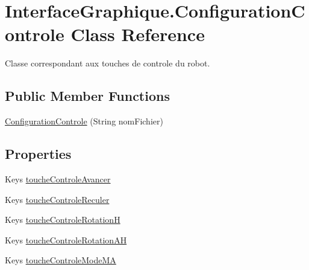 \hypertarget{class_interface_graphique_1_1_configuration_controle}{}\section{Interface\+Graphique.\+Configuration\+Controle Class Reference}
\label{class_interface_graphique_1_1_configuration_controle}


Classe correspondant aux touches de controle du robot.  


\subsection*{Public Member Functions}
\begin{DoxyCompactItemize}
\item 
\hyperlink{group__inf2990_ga88dec4378a0a6a4e0ad4d7bc3b6d516a}{Configuration\+Controle} (String nom\+Fichier)
\end{DoxyCompactItemize}
\subsection*{Properties}
\begin{DoxyCompactItemize}
\item 
Keys \hyperlink{group__inf2990_ga52e17be4f7288e0b10e953bd432ecec9}{touche\+Controle\+Avancer}
\item 
Keys \hyperlink{group__inf2990_ga96cf491ad288a4ef333cb27f6ff718d6}{touche\+Controle\+Reculer}
\item 
Keys \hyperlink{group__inf2990_gacc59582f5bd9413c8b5ace6a7fa1f878}{touche\+Controle\+RotationH}
\item 
Keys \hyperlink{group__inf2990_gac59b13bc9365127dcbb28b0e69028f72}{touche\+Controle\+Rotation\+AH}
\item 
Keys \hyperlink{group__inf2990_ga1db9ae672823b158bccee9da821c89f0}{touche\+Controle\+Mode\+MA}
\end{DoxyCompactItemize}


